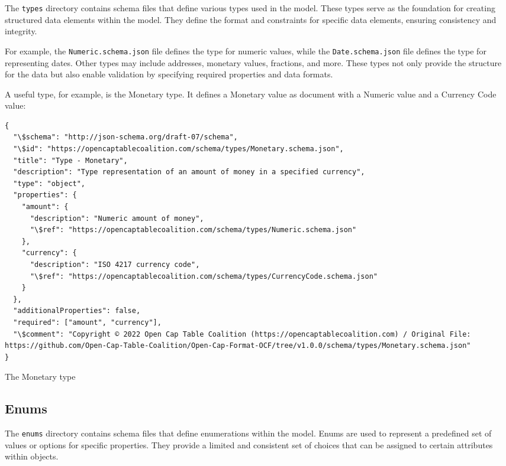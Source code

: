 The \texttt{types} directory contains schema files that define various types used in the model. These types serve as the foundation for creating structured data elements within the model. They define the format and constraints for specific data elements, ensuring consistency and integrity.

For example, the \texttt{Numeric.schema.json} file defines the type for numeric values, while the \texttt{Date.schema.json} file defines the type for representing dates. Other types may include addresses, monetary values, fractions, and more. These types not only provide the structure for the data but also enable validation by specifying required properties and data formats.

A useful type, for example, is the Monetary type. It defines a Monetary value as document with a Numeric value and a Currency Code value:

\begin{listing}[!h]
\begin{verbatim}
{
  "\$schema": "http://json-schema.org/draft-07/schema",
  "\$id": "https://opencaptablecoalition.com/schema/types/Monetary.schema.json",
  "title": "Type - Monetary",
  "description": "Type representation of an amount of money in a specified currency",
  "type": "object",
  "properties": {
    "amount": {
      "description": "Numeric amount of money",
      "\$ref": "https://opencaptablecoalition.com/schema/types/Numeric.schema.json"
    },
    "currency": {
      "description": "ISO 4217 currency code",
      "\$ref": "https://opencaptablecoalition.com/schema/types/CurrencyCode.schema.json"
    }
  },
  "additionalProperties": false,
  "required": ["amount", "currency"],
  "\$comment": "Copyright © 2022 Open Cap Table Coalition (https://opencaptablecoalition.com) / Original File: https://github.com/Open-Cap-Table-Coalition/Open-Cap-Format-OCF/tree/v1.0.0/schema/types/Monetary.schema.json"
}
\end{verbatim}
\caption{The Monetary type}
\label{lst:monetary}
\end{listing}


\subsection{Enums}

The \texttt{enums} directory contains schema files that define enumerations within the model. Enums are used to represent a predefined set of values or options for specific properties. They provide a limited and consistent set of choices that can be assigned to certain attributes within objects.

